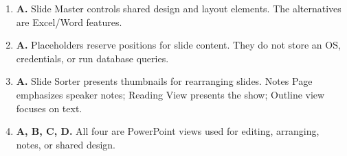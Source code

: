 \begin{enumerate}[label=\textbf{Q\arabic*.}, leftmargin=*]
\item \textbf{A.} Slide Master controls shared design and layout elements. The alternatives are Excel/Word features.

\item \textbf{A.} Placeholders reserve positions for slide content. They do not store an OS, credentials, or run database queries.

\item \textbf{A.} Slide Sorter presents thumbnails for rearranging slides. Notes Page emphasizes speaker notes; Reading View presents the show; Outline view focuses on text.

\item \textbf{A, B, C, D.} All four are PowerPoint views used for editing, arranging, notes, or shared design.

\end{enumerate}
